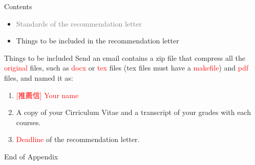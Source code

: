 \documentclass{beamer}
\begin{document}
\begin{frame}{Contents}
\begin{itemize}
\item \textcolor{gray}{Standards of the recommendation letter}
\item Things to be included in the recommendation letter
\end{itemize}
\end{frame}
\begin{frame}{Things to be included}
Send an email contains a zip file that compress all the \textcolor{red}{original} files, such as \textcolor{red}{docx} or \textcolor{red}{tex} files (tex files must have a \textcolor{red}{makefile}) and \textcolor{red}{pdf} files, and named it as: \\
\begin{enumerate}
\item \textcolor{red}{[推薦信]} \textcolor{red}{Your name}
\item A copy of your Cirriculum Vitae and a transcript of your grades with each courses.
\item \textcolor{red}{Deadline} of the recommendation letter.
\end{enumerate}
\end{frame}
\begin{frame}{}
\begin{center}
\Large{End of Appendix}
\end{center}
\end{frame}
\end{document}
